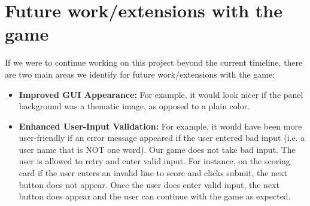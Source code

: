 \documentclass[]{report}   %
\begin{document}
\section{Future work/extensions with the game}     %
If we were to continue working on this project beyond the current timeline, there are two main areas we identify for future work/extensions with the game:
\begin{itemize}
\item \textbf{Improved GUI Appearance:} For example, it would look nicer if the panel background was a thematic image, as opposed to a plain color.
\item \textbf{Enhanced User-Input Validation:} For example, it would have been more user-friendly if an error message appeared if the user entered bad input (i.e. a user name that is NOT one word). Our game does not take bad input. The user is allowed to retry and enter valid input. For instance, on the scoring card if the user enters an invalid line to score and clicks submit, the next button does not appear. Once the user does enter valid input, the next button does appear and the user can continue with the game as expected. 
\end{itemize}
\end{document}
